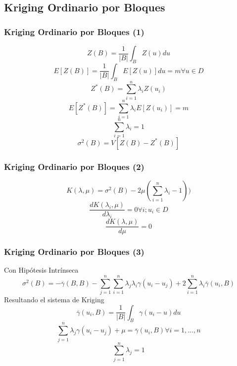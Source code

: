 \documentclass{beamer}
\begin{document}
\subsection{Kriging Ordinario por Bloques}
\begin{frame}
\frametitle{Kriging Ordinario por Bloques (1)}
\begin{equation}
Z(B) = \frac{1}{|B|}\int_{B}Z(u)du
\end{equation}
\begin{equation}
E[Z(B)] = \frac{1}{|B|}\int_{B}E[Z(u)]du = m \forall u \in D
\end{equation}
\begin{equation}
Z^*(B)=\sum_{i=1}^n\lambda_i Z(u_i)
\end{equation}
\begin{equation}
E[Z^*(B)]=\sum_{i=1}^n\lambda_i E[Z(u_i)] = m
\end{equation}
\begin{equation}
\sum_{i=1}^n\lambda_i = 1
\end{equation}
\begin{equation}
\sigma^2(B) = V[Z(B)-Z^*(B)]
\end{equation}
\end{frame}

\begin{frame}
\frametitle{Kriging Ordinario por Bloques (2)}
\begin{equation}
K(\lambda, \mu) = \sigma^2(B) - 2 \mu(\sum_{i=1}^n\lambda_i - 1))
\end{equation}
\begin{equation}
\frac{dK(\lambda_i, \mu)}{d\lambda_i} = 0 \forall i; u_i \in D
\end{equation}
\begin{equation}
\frac{dK(\lambda, \mu)}{d\mu} = 0
\end{equation}
\end{frame}

\begin{frame}
\frametitle{Kriging Ordinario por Bloques (3)}
Con Hipótesis Intrínseca
\begin{equation}
\sigma^2(B) = - \overline{\gamma}(B,B) - \sum_{j=1}^n\sum_{i=1}^n \lambda_j \lambda_i \gamma(u_i - u_j) + 2 \sum_{i=1}^n \lambda_i \overline{\gamma}(u_i,B)
\end{equation}
Resultando el sistema de Kriging
\begin{equation}
\overline{\gamma}(u_i,B) = \frac{1}{|B|}\int_{B}\gamma(u_i - u) du
\end{equation}
\begin{equation}
\sum_{j=1}^n \lambda_j \gamma(u_i - u_j) + \mu = \overline{\gamma}(u_i, B) \forall i = 1,...,n
\end{equation}
\begin{equation}
\sum_{j=1}^n \lambda_j = 1
\end{equation}
\end{frame}
\end{document}
